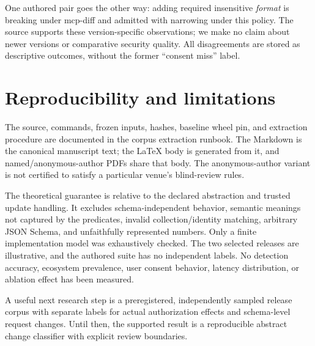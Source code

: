 One authored pair goes the other way: adding required insensitive \emph{format} is breaking under mcp-diff and admitted with narrowing under this policy. The source supports these version-specific observations; we make no claim about newer versions or comparative security quality. All disagreements are stored as descriptive outcomes, without the former ``consent miss'' label.

\section{Reproducibility and limitations}\label{reproducibility-and-limitations}

The source, commands, frozen inputs, hashes, baseline wheel pin, and extraction procedure are documented in the corpus extraction runbook. The Markdown is the canonical manuscript text; the LaTeX body is generated from it, and named/anonymous-author PDFs share that body. The anonymous-author variant is not certified to satisfy a particular venue's blind-review rules.

The theoretical guarantee is relative to the declared abstraction and trusted update handling. It excludes schema-independent behavior, semantic meanings not captured by the predicates, invalid collection/identity matching, arbitrary JSON Schema, and unfaithfully represented numbers. Only a finite implementation model was exhaustively checked. The two selected releases are illustrative, and the authored suite has no independent labels. No detection accuracy, ecosystem prevalence, user consent behavior, latency distribution, or ablation effect has been measured.

A useful next research step is a preregistered, independently sampled release corpus with separate labels for actual authorization effects and schema-level request changes. Until then, the supported result is a reproducible abstract change classifier with explicit review boundaries.
